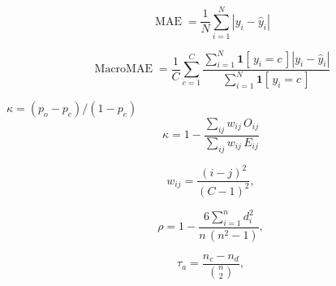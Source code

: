 \documentclass[11pt]{article}
\begin{document}
\begin{equation}
    \operatorname{MAE} = \frac{1}{N}\sum_{i=1}^{N}\left|y_i-\widehat{y}_i\right|
\end{equation}

\begin{equation}
    \operatorname{MacroMAE} = \frac{1}{C}\sum_{c=1}^{C}\frac{\sum_{i=1}^{N}\mathbf{1}\!\left[\,y_i=c\,\right]\left|y_i-\widehat{y}_i\right|}{\sum_{i=1}^{N}\mathbf{1}\!\left[\,y_i=c\,\right]}
\end{equation}

$ \kappa = (p_o-p_e)/(1-p_e) $
\begin{equation}
\kappa = 1 - \frac{\sum_{ij} w_{ij}\,O_{ij}}{\sum_{ij} w_{ij}\,E_{ij}}
\end{equation}

\begin{equation}
w_{ij} = \frac{(i-j)^2}{(C-1)^2},
\label{eq:qwk}
\end{equation}

\begin{equation}
\rho = 1 - \frac{6\sum_{i=1}^{n} d_i^{2}}{n\,(n^{2}-1)},
\end{equation}

\begin{equation}
\tau_a = \frac{n_c - n_d}{\binom{n}{2}},
\end{equation}
\end{document}
